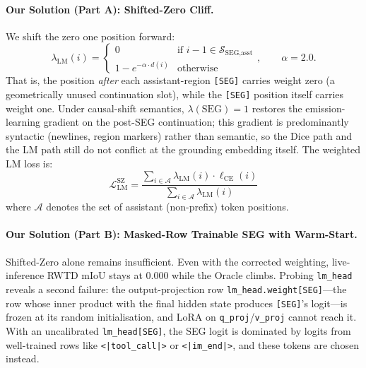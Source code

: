 \documentclass{article}
\begin{document}
\paragraph{Our Solution (Part A): Shifted-Zero Cliff.}
We shift the zero one position forward:
\begin{equation}
    \lambda_{\text{LM}}(i) = \begin{cases}
        0 & \text{if } i - 1 \in \mathcal{S}_{\text{SEG,asst}} \\
        1 - e^{-\alpha \cdot d(i)} & \text{otherwise}
    \end{cases}, \qquad \alpha = 2.0.
\end{equation}
That is, the position \emph{after} each assistant-region \texttt{[SEG]} carries weight zero (a geometrically unused continuation slot), while the \texttt{[SEG]} position itself carries weight one. Under causal-shift semantics, $\lambda(\text{SEG}) = 1$ restores the emission-learning gradient on the post-SEG continuation; this gradient is predominantly syntactic (newlines, region markers) rather than semantic, so the Dice path and the LM path still do not conflict at the grounding embedding itself. The weighted LM loss is:
\begin{equation}
    \mathcal{L}_{\text{LM}}^{\text{SZ}} = \frac{\sum_{i \in \mathcal{A}} \lambda_{\text{LM}}(i) \cdot \ell_{\text{CE}}(i)}{\sum_{i \in \mathcal{A}} \lambda_{\text{LM}}(i)}
\end{equation}
where $\mathcal{A}$ denotes the set of assistant (non-prefix) token positions.

\paragraph{Our Solution (Part B): Masked-Row Trainable SEG with Warm-Start.}
Shifted-Zero alone remains insufficient. Even with the corrected weighting, live-inference RWTD mIoU stays at 0.000 while the Oracle climbs. Probing \texttt{lm\_head} reveals a second failure: the output-projection row \texttt{lm\_head.weight[SEG]}---the row whose inner product with the final hidden state produces \texttt{[SEG]}'s logit---is frozen at its random initialisation, and LoRA on \texttt{q\_proj}/\texttt{v\_proj} cannot reach it. With an uncalibrated \texttt{lm\_head[SEG]}, the SEG logit is dominated by logits from well-trained rows like \texttt{<|tool\_call|>} or \texttt{<|im\_end|>}, and these tokens are chosen instead.
\end{document}
